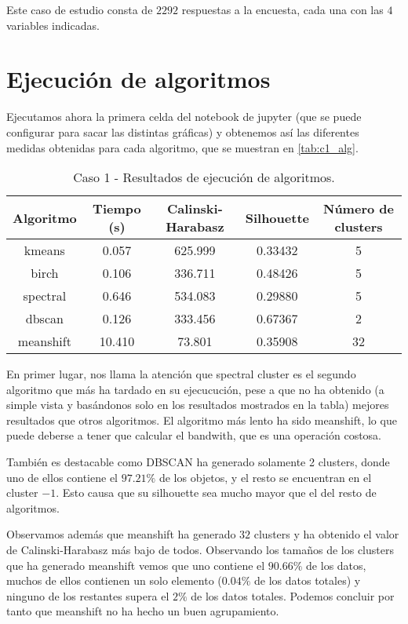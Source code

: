 Este caso de estudio consta de $2292$ respuestas a la encuesta, cada una con las $4$ variables indicadas.

\section{Ejecución de algoritmos}

Ejecutamos ahora la primera celda del notebook de jupyter (que se puede configurar para sacar las distintas gráficas) y obtenemos así las diferentes medidas obtenidas para cada algoritmo, que se muestran en \eqref{tab:c1_alg}.

\begin{table}[ht]
\centering
\caption{Caso 1 - Resultados de ejecución de algoritmos.}
\label{tab:c1_alg}
\begin{tabular}{ccccc}
\toprule
 Algoritmo & Tiempo (s) & Calinski-Harabasz & Silhouette & Número de clusters \\
\midrule
kmeans & 0.057 & 625.999 & 0.33432 & 5 \\
birch & 0.106 & 336.711 & 0.48426 & 5 \\
spectral & 0.646 & 534.083 & 0.29880 & 5 \\
dbscan & 0.126 & 333.456 & 0.67367 & 2 \\
meanshift & 10.410 & 73.801 & 0.35908 & 32 \\
\bottomrule
\end{tabular}
\end{table}

En primer lugar, nos llama la atención que spectral cluster es el segundo algoritmo que más ha tardado en su ejecucución, pese a que no ha obtenido (a simple vista y basándonos solo en los resultados mostrados en la tabla) mejores resultados que otros algoritmos. El algoritmo más lento ha sido meanshift, lo que puede deberse a tener que calcular el bandwith, que es una operación costosa.

También es destacable como DBSCAN ha generado solamente 2 clusters, donde uno de ellos contiene el $97.21\%$ de los objetos, y el resto se encuentran en el cluster $-1$. Esto causa que su silhouette sea mucho mayor que el del resto de algoritmos.

Observamos además que meanshift ha generado $32$ clusters y ha obtenido el valor de Calinski-Harabasz más bajo de todos. Observando los tamaños de los clusters que ha generado meanshift vemos que uno contiene el $90.66\%$ de los datos, muchos de ellos contienen un solo elemento ($0.04\%$ de los datos totales) y ninguno de los restantes supera el $2\%$ de los datos totales. Podemos concluir por tanto que meanshift no ha hecho un buen agrupamiento.

